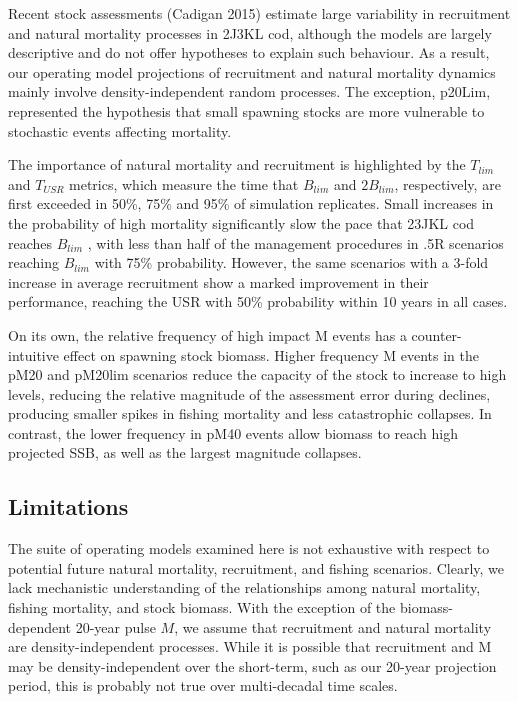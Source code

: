 \documentclass[12pt,]{article}
\begin{document}
Recent stock assessments (Cadigan 2015) estimate large variability in
recruitment and natural mortality processes in 2J3KL cod, although the
models are largely descriptive and do not offer hypotheses to explain
such behaviour. As a result, our operating model projections of
recruitment and natural mortality dynamics mainly involve
density-independent random processes. The exception, p20Lim, represented
the hypothesis that small spawning stocks are more vulnerable to
stochastic events affecting mortality.

The importance of natural mortality and recruitment is highlighted by
the \(T_{lim}\)⁡ and \(T_{USR}\) metrics, which measure the time that
\(B_{lim}\) and \(2B_{lim}\), respectively, are first exceeded in 50\%,
75\% and 95\% of simulation replicates. Small increases in the
probability of high mortality significantly slow the pace that 23JKL cod
reaches \(B_{lim}\) , with less than half of the management procedures
in .5R scenarios reaching \(B_{lim}\) with 75\% probability. However,
the same scenarios with a 3-fold increase in average recruitment show a
marked improvement in their performance, reaching the USR with 50\%
probability within 10 years in all cases.

On its own, the relative frequency of high impact M events has a
counter-intuitive effect on spawning stock biomass. Higher frequency M
events in the pM20 and pM20lim scenarios reduce the capacity of the
stock to increase to high levels, reducing the relative magnitude of the
assessment error during declines, producing smaller spikes in fishing
mortality and less catastrophic collapses. In contrast, the lower
frequency in pM40 events allow biomass to reach high projected SSB, as
well as the largest magnitude collapses.

\subsection{Limitations}\label{limitations}

The suite of operating models examined here is not exhaustive with
respect to potential future natural mortality, recruitment, and fishing
scenarios. Clearly, we lack mechanistic understanding of the
relationships among natural mortality, fishing mortality, and stock
biomass. With the exception of the biomass-dependent 20-year pulse
\(M\), we assume that recruitment and natural mortality are
density-independent processes. While it is possible that recruitment and
M may be density-independent over the short-term, such as our 20-year
projection period, this is probably not true over multi-decadal time
scales.
\end{document}
